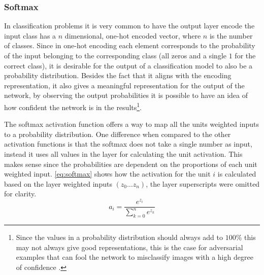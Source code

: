 \subsubsection{Softmax}
In classification problems it is very common to have the output layer encode the input class has a $n$ dimensional, one-hot encoded vector, where $n$ is the number of classes. Since in one-hot encoding each element corresponds to the probability of the input belonging to the corresponding class (all zeros and a single $1$ for the correct class), it is desirable for the output of a classification model to also be a probability distribution. Besides the fact that it aligns with the encoding representation, it also gives a meaningful representation for the output of the network, by observing the output probabilities it is possible to have an idea of how confident the network is in the results\footnote{
    Since the values in a probability distribution should always add to $100\%$ this may not always give good representations, this is the case for adversarial examples that can fool the network to misclassify images with a high degree of confidence \cite{adversarialExamples2013}.
}.

The softmax activation function offers a way to map all the units weighted inputs to a probability distribution. One difference when compared to the other activation functions is that the softmax does not take a single number as input, instead it uses all values in the layer for calculating the unit activation. This makes sense since the probabilities are dependent on the proportions of each unit weighted input. \autoref{eq:softmax} shows how the activation for the unit $i$ is calculated based on the layer weighted inputs $(z_0 \dots z_n)$, the layer superscripts were omitted for clarity.
\begin{equation} \label{eq:softmax}
    a_i = \frac{e^{z_i}}{ \sum\limits_{k=0}^{n}{e^{z_k}} }
\end{equation}
